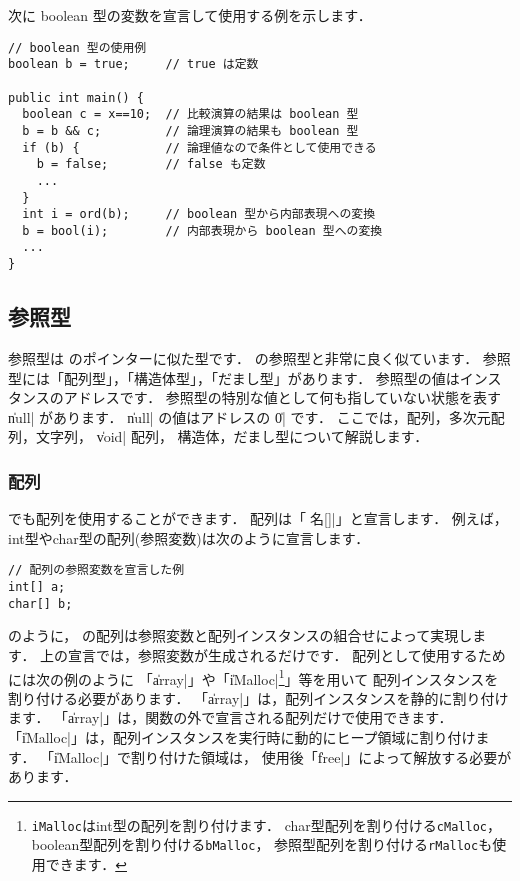 次に boolean 型の変数を宣言して使用する例を示します．

\begin{mylist}
\begin{verbatim}
// boolean 型の使用例
boolean b = true;     // true は定数

public int main() {
  boolean c = x==10;  // 比較演算の結果は boolean 型
  b = b && c;         // 論理演算の結果も boolean 型
  if (b) {            // 論理値なので条件として使用できる
    b = false;        // false も定数
    ...
  }
  int i = ord(b);     // boolean 型から内部表現への変換
  b = bool(i);        // 内部表現から boolean 型への変換
  ...
}
\end{verbatim}
\end{mylist}

\subsection{参照型}
\label{chap3:ref}

参照型は \cl のポインターに似た型です．
\javal の参照型と非常に良く似ています．
参照型には「配列型」，「構造体型」，「だまし型」があります．
参照型の値はインスタンスのアドレスです．
参照型の特別な値として何も指していない状態を表す \|null| があります．
\|null| の値はアドレスの \|0| です．
ここでは，配列，多次元配列，文字列， \|void| 配列，
構造体，だまし型について解説します．

\subsubsection{配列}
\label{chap3:array}
\cmml でも配列を使用することができます．
配列は「\|型名[]|」と宣言します．
例えば，int型やchar型の配列(参照変数)は次のように宣言します．

\begin{mylist}
\begin{verbatim}
// 配列の参照変数を宣言した例
int[] a;
char[] b;
\end{verbatim}
\end{mylist}


のように，
\cmml の配列は参照変数と配列インスタンスの組合せによって実現します．
上の宣言では，参照変数が生成されるだけです．
配列として使用するためには次の例のように
「\|array|」や「\|iMalloc|\footnote{
\texttt{iMalloc}はint型の配列を割り付けます．
char型配列を割り付ける\texttt{cMalloc}，
boolean型配列を割り付ける\texttt{bMalloc}，
参照型配列を割り付ける\texttt{rMalloc}も使用できます．
}」等を用いて
配列インスタンスを割り付ける必要があります．
「\|array|」は，配列インスタンスを静的に割り付けます．
「\|array|」は，関数の外で宣言される配列だけで使用できます．
「\|iMalloc|」は，配列インスタンスを実行時に動的にヒープ領域に割り付けます．
「\|iMalloc|」で割り付けた領域は，
使用後「\|free|」によって解放する必要があります．

